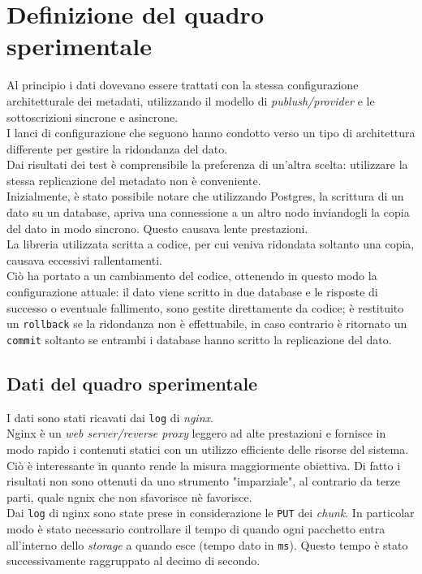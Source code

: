 \chapter{Definizione del quadro sperimentale}
\setcounter{section}{1}
Al principio i dati dovevano essere trattati con la stessa configurazione architetturale dei metadati, utilizzando il modello di \textit{publush/provider} e le sottoscrizioni sincrone e asincrone.\\

I lanci di configurazione che seguono hanno condotto verso un tipo di architettura differente per gestire la ridondanza del dato.\\
Dai risultati dei test \`{e} comprensibile la preferenza di un'altra scelta: utilizzare la stessa replicazione del metadato non \`{e} conveniente.\\

Inizialmente, \`{e} stato possibile notare che utilizzando Postgres, la scrittura di un dato su un database, apriva una connessione a un altro nodo inviandogli la copia del dato in modo sincrono. Questo causava lente prestazioni.\\
La libreria utilizzata scritta a codice, per cui veniva ridondata soltanto una copia, causava eccessivi rallentamenti.\\

Ci\`{o} ha portato a un cambiamento del codice, ottenendo in questo modo la configurazione attuale: il dato viene scritto in due database e le risposte di successo o eventuale fallimento, sono gestite direttamente da codice; \`{e} restituito un \verb"rollback" se la ridondanza non \`{e} effettuabile, in caso contrario \`{e} ritornato un \verb"commit" soltanto se entrambi i database hanno scritto la replicazione del dato.

\item 
\section{Dati del quadro sperimentale}
I dati sono stati ricavati dai \verb"log" di \textit{nginx}. \\
Nginx \`{e} un \textit{web server/reverse proxy} leggero ad alte prestazioni e fornisce in modo rapido i contenuti statici con un utilizzo efficiente delle risorse del sistema.\\
Ci\`{o} \`{e} interessante in quanto rende la misura maggiormente obiettiva. Di fatto i risultati non sono ottenuti da uno strumento "imparziale", al contrario da terze parti, quale ngnix che non sfavorisce n\`{e} favorisce.\\
Dai \verb"log" di nginx sono state prese in considerazione le \verb"PUT" dei \textit{chunk}. In particolar modo \`{e} stato necessario controllare il tempo di quando ogni pacchetto entra all'interno dello \textit{storage} a quando esce (tempo dato in \verb"ms"). Questo tempo \`{e} stato successivamente raggruppato al decimo di secondo.\\

